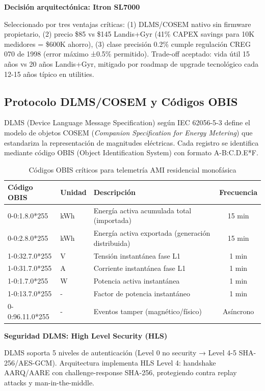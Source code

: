 \textbf{Decisión arquitectónica: Itron SL7000}

Seleccionado por tres ventajas críticas: (1) DLMS/COSEM nativo sin firmware propietario, (2) precio \$85 vs \$145 Landis+Gyr (41\% CAPEX savings para 10K medidores = \$600K ahorro), (3) clase precisión 0.2\% cumple regulación CREG 070 de 1998 (error máximo ±0.5\% permitido). Trade-off aceptado: vida útil 15 años vs 20 años Landis+Gyr, mitigado por roadmap de upgrade tecnológico cada 12-15 años típico en utilities.

\subsection{Protocolo DLMS/COSEM y Códigos OBIS}

DLMS (Device Language Message Specification) según IEC 62056-5-3 define el modelo de objetos COSEM (\textit{Companion Specification for Energy Metering}) que estandariza la representación de magnitudes eléctricas. Cada registro se identifica mediante código OBIS (Object Identification System) con formato A-B:C.D.E*F.

\begin{table}[H]
\centering
\caption{Códigos OBIS críticos para telemetría AMI residencial monofásica}
\label{tab:obis-codes}
\begin{tabular}{|l|l|p{5cm}|c|}
\hline
\rowcolor{gray!20}
\textbf{Código OBIS} & \textbf{Unidad} & \textbf{Descripción} & \textbf{Frecuencia} \\
\hline
0-0:1.8.0*255 & kWh & Energía activa acumulada total (importada) & 15 min \\
\hline
0-0:2.8.0*255 & kWh & Energía activa exportada (generación distribuida) & 15 min \\
\hline
1-0:32.7.0*255 & V & Tensión instantánea fase L1 & 1 min \\
\hline
1-0:31.7.0*255 & A & Corriente instantánea fase L1 & 1 min \\
\hline
1-0:1.7.0*255 & W & Potencia activa instantánea & 1 min \\
\hline
1-0:13.7.0*255 & - & Factor de potencia instantáneo & 1 min \\
\hline
0-0:96.11.0*255 & - & Eventos tamper (magnético/físico) & Asíncrono \\
\hline
\end{tabular}
\end{table}

\textbf{Seguridad DLMS: High Level Security (HLS)}

DLMS soporta 5 niveles de autenticación (Level 0 no security → Level 4-5 SHA-256/AES-GCM). Arquitectura implementa HLS Level 4: handshake AARQ/AARE con challenge-response SHA-256, protegiendo contra replay attacks y man-in-the-middle.


